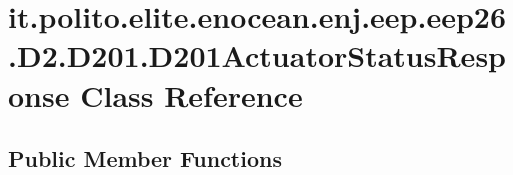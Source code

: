 \hypertarget{classit_1_1polito_1_1elite_1_1enocean_1_1enj_1_1eep_1_1eep26_1_1_d2_1_1_d201_1_1_d201_actuator_status_response}{}\section{it.\+polito.\+elite.\+enocean.\+enj.\+eep.\+eep26.\+D2.\+D201.\+D201\+Actuator\+Status\+Response Class Reference}
\label{classit_1_1polito_1_1elite_1_1enocean_1_1enj_1_1eep_1_1eep26_1_1_d2_1_1_d201_1_1_d201_actuator_status_response}
\subsection*{Public Member Functions}
